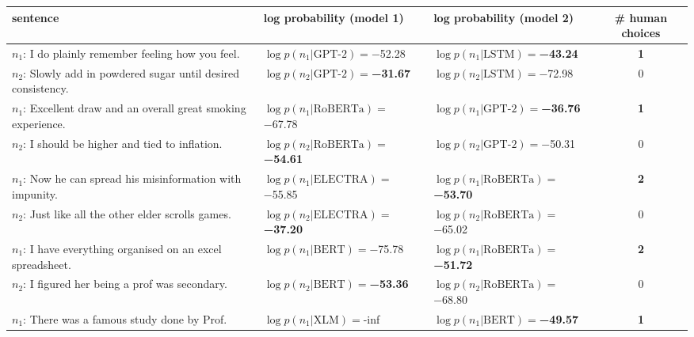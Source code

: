 \begin{tabularx}{\textwidth}{lllc}
\toprule
                                                              sentence &                               log probability (model 1) &                               log probability (model 2) &  \# human choices \\
\midrule
                    $n_1$: I do plainly remember feeling how you feel. &             $\log p(n_1 | \textrm{GPT-2})=$\num{-52.28} &     $\log p(n_1 | \textrm{LSTM})=$\textbf{\num{-43.24}} &  \textbf{\num{1}} \\
        $n_2$: Slowly add in powdered sugar until desired consistency. &    $\log p(n_2 | \textrm{GPT-2})=$\textbf{\num{-31.67}} &              $\log p(n_2 | \textrm{LSTM})=$\num{-72.98} &           \num{0} \\\midrule
        $n_1$: Excellent draw and an overall great smoking experience. &           $\log p(n_1 | \textrm{RoBERTa})=$\num{-67.78} &    $\log p(n_1 | \textrm{GPT-2})=$\textbf{\num{-36.76}} &  \textbf{\num{1}} \\
                      $n_2$: I should be higher and tied to inflation. &  $\log p(n_2 | \textrm{RoBERTa})=$\textbf{\num{-54.61}} &             $\log p(n_2 | \textrm{GPT-2})=$\num{-50.31} &           \num{0} \\\midrule
            $n_1$: Now he can spread his misinformation with impunity. &           $\log p(n_1 | \textrm{ELECTRA})=$\num{-55.85} &  $\log p(n_1 | \textrm{RoBERTa})=$\textbf{\num{-53.70}} &  \textbf{\num{2}} \\
                   $n_2$: Just like all the other elder scrolls games. &  $\log p(n_2 | \textrm{ELECTRA})=$\textbf{\num{-37.20}} &           $\log p(n_2 | \textrm{RoBERTa})=$\num{-65.02} &           \num{0} \\\midrule
           $n_1$: I have everything organised on an excel spreadsheet. &              $\log p(n_1 | \textrm{BERT})=$\num{-75.78} &  $\log p(n_1 | \textrm{RoBERTa})=$\textbf{\num{-51.72}} &  \textbf{\num{2}} \\
                      $n_2$: I figured her being a prof was secondary. &     $\log p(n_2 | \textrm{BERT})=$\textbf{\num{-53.36}} &           $\log p(n_2 | \textrm{RoBERTa})=$\num{-68.80} &           \num{0} \\\midrule
                         $n_1$: There was a famous study done by Prof. &                 $\log p(n_1 | \textrm{XLM})=$\num{-inf} &     $\log p(n_1 | \textrm{BERT})=$\textbf{\num{-49.57}} &  \textbf{\num{1}} \\

\end{tabularx}

